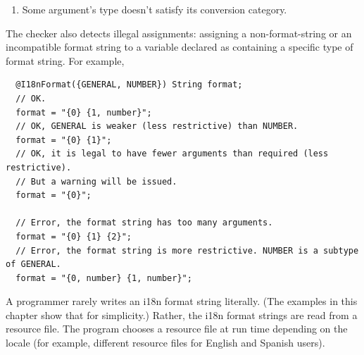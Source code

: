 \begin{enumerate}
\begin{enumerate}
\begin{itemize}
          \item Unknown format type.


          \item Missing a format style required for \<choice> format.


          \item Wrong format style.


          \item Invalid subformats.

        \end{itemize}

      \item Some argument's type doesn't satisfy its conversion category.

    \end{enumerate}
\end{enumerate}

The checker also detects illegal assignments: assigning a non-format-string
or an incompatible format string to a variable declared as containing a
specific type of format string. For example,

\begin{Verbatim}
  @I18nFormat({GENERAL, NUMBER}) String format;
  // OK.
  format = "{0} {1, number}";
  // OK, GENERAL is weaker (less restrictive) than NUMBER.
  format = "{0} {1}";
  // OK, it is legal to have fewer arguments than required (less restrictive).
  // But a warning will be issued.
  format = "{0}";

  // Error, the format string has too many arguments.
  format = "{0} {1} {2}";
  // Error, the format string is more restrictive. NUMBER is a subtype of GENERAL.
  format = "{0, number} {1, number}";
\end{Verbatim}


A programmer rarely writes an i18n format string literally. (The examples
in this chapter show that for simplicity.) Rather, the i18n format strings are
read from a resource file.  The program chooses a resource file at run time
depending on the locale (for example, different resource files for English
and Spanish users).

